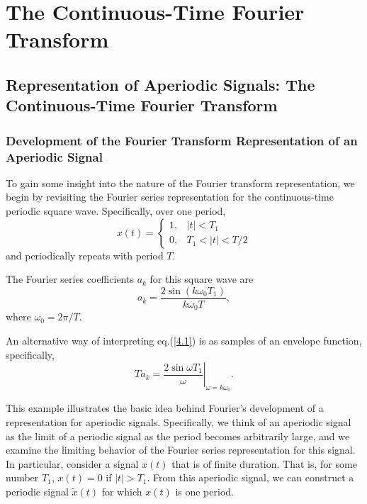 \documentclass[a4paper,10pt,twoside]{book}
\begin{document}
\chapter{The Continuous-Time Fourier Transform}
\section{Representation of Aperiodic Signals: The Continuous-Time Fourier Transform}
\label{section:4.1}

\subsection{Development of the Fourier Transform Representation of an Aperiodic Signal}

To gain some insight into the nature of the Fourier transform representation, we begin by revisiting the Fourier series representation for the continuous-time periodic square wave. Specifically, over one period, $$\left.x(t) = \left\{\begin{array}{ll}1,&|t|<T_1\\0,&T_1<|t|<T/2\end{array}\right.\right.$$ and periodically repeats with period $T$.

The Fourier series coefficients $a_k$ for this square wave are
\begin{equation}
    a_k=\frac{2\sin(k\omega_0T_1)}{k\omega_0T},
    \label{4.1}
\end{equation}
where $\omega_0=2\pi/T$.

An alternative way of interpreting eq.\;(\ref{4.1}) is as samples of an envelope function, specifically,
\begin{equation}
    Ta_k=\left.\frac{2\sin\omega T_1}\omega\right|_{\omega=k\omega_0}.
    \label{4.2}
\end{equation}

This example illustrates the basic idea behind Fourier's development of a representation for aperiodic signals. Specifically, we think of an aperiodic signal as the limit of a periodic signal as the period becomes arbitrarily large, and we examine the limiting behavior of the Fourier series representation for this signal. In particular, consider a signal $x(t)$ that is of finite duration. That is, for some number $T_1$, $x(t)=0$ if $|t|>T_1$. From this aperiodic signal, we can construct a periodic signal $\tilde{x}(t)$ for which $x(t)$ is one period.
\end{document}
